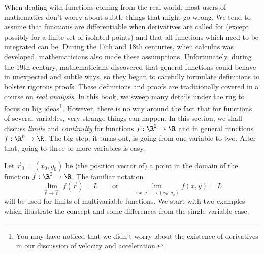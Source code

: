 When dealing with functions coming from the real world,
most users of mathematics don't worry about subtle things that might
go wrong.
We tend to assume that  functions  are differentiable when derivatives
are called for  (except possibly for a finite set of isolated points)
and that all functions which need to be integrated can be.   
During the 17th and 18th centuries, when calculus was developed,
mathematicians also made these assumptions.   Unfortunately,
during the 19th century, mathematicians discovered that general
functions could behave in  unexpected and subtle ways, so they began to 
carefully formulate definitions to bolster rigorous
proofs.   These definitions and proofs are traditionally
covered in a course on \emph{real analysis}.  In this book, we sweep many
details under the rug to focus on big ideas\footnote{ You may have noticed that we didn't worry
about the existence of derivatives in our discussion of
velocity and acceleration.}.  However, there is no way around the fact
that for functions of several variables, very strange things can happen.
 In this section, we shall discuss \emph{limits} and \emph{continuity} for functions $f:\R^2 \to \R$
 and in general functions $f:\R^n\to\R$.
The big step, it turns out, is going from one
variable to two.
After that, going to three or more
variables is easy.

Let  $\vec r_0 = ( x_0, y_0 )$ be (the position vector of) a point
in the domain of the function $f:\R^2\to\R$.   The familiar notation
\[
    \lim_{\vec r \to \vec r_0} f(\vec r) = L \qquad\text{or}\qquad 
   \lim_{(x,y)\to (x_0,y_0)} f(x,y) = L
\]
%
will be used
for limits of multivariable functions.
We start with two examples which illustrate the concept and some
differences from the single variable case.

